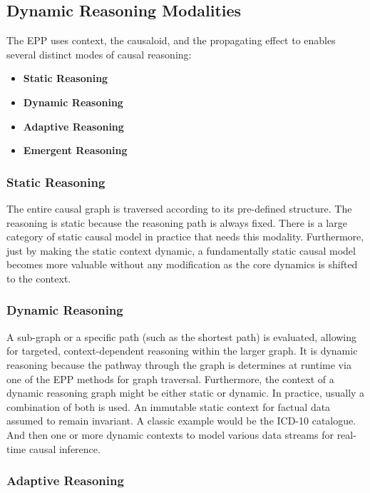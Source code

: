   
%
%
\subsection{Dynamic Reasoning Modalities}
\label{sec:epp_dynamic_modalities}

  
The EPP uses context, the causaloid, and the propagating effect to enables several distinct modes of causal reasoning: 

\begin{itemize}	
	\item \textbf{Static Reasoning}
	\item \textbf{Dynamic Reasoning}
	\item \textbf{Adaptive Reasoning} 
	\item \textbf{Emergent Reasoning} 
\end{itemize}


\subsubsection{Static Reasoning}

The entire causal graph is traversed according to its pre-defined structure. The reasoning is static because the reasoning path is always fixed. There is a large category of static causal model in practice that needs this modality. Furthermore, just by making the static context dynamic, a fundamentally static causal model becomes more valuable without any modification as the core dynamics is shifted to the context.  

\subsubsection{Dynamic Reasoning}


A sub-graph or a specific path (such as the shortest path) is evaluated, allowing for targeted, context-dependent reasoning within the larger graph. It is dynamic reasoning because the pathway through the graph is determines at runtime via one of the EPP methods for graph traversal. Furthermore, the context of a dynamic reasoning graph might be either static or dynamic. In practice, usually a combination of both is used. An immutable static context for factual data assumed to remain invariant. A classic example would be the ICD-10 catalogue. And then one or more dynamic contexts to model various data streams for real-time causal inference. 

\subsubsection{Adaptive Reasoning}


